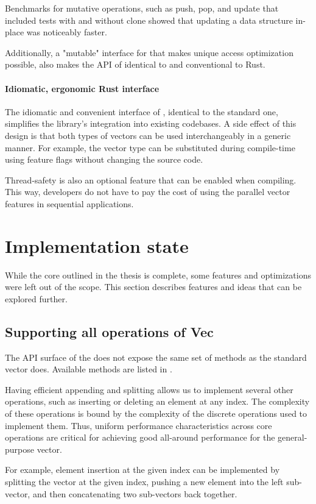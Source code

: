 Benchmarks for mutative operations, such as push, pop, and update that included tests with and without clone showed that updating a data structure in-place was noticeably faster.

Additionally, a "mutable" interface for \pvec{} that makes unique access optimization possible, also makes the API of \pvec{} identical to \stdvec{} and conventional to Rust.

\paragraph{Idiomatic, ergonomic Rust interface}
The idiomatic and convenient interface of \pvecrs{}, identical to the standard one, simplifies the library's integration into existing codebases. A side effect of this design is that both types of vectors can be used interchangeably in a generic manner. For example, the vector type can be substituted during compile-time using feature flags without changing the source code.

Thread-safety is also an optional feature that can be enabled when compiling. This way, developers do not have to pay the cost of using the parallel vector features in sequential applications.

\section{Implementation state}
While the \pvecrs{} core outlined in the thesis is complete, some features and optimizations were left out of the scope. This section describes features and ideas that can be explored further.

\subsection{Supporting all operations of Vec}
The API surface of the \pvecrs{} does not expose the same set of methods as the standard vector does. Available methods are listed in .

Having efficient appending and splitting allows us to implement several other operations, such as inserting or deleting an element at any index. The complexity of these operations is bound by the complexity of the discrete operations used to implement them. Thus, uniform performance characteristics across core operations are critical for achieving good all-around performance for the general-purpose vector.

For example, element insertion at the given index can be implemented by splitting the vector at the given index, pushing a new element into the left sub-vector, and then concatenating two sub-vectors back together.

